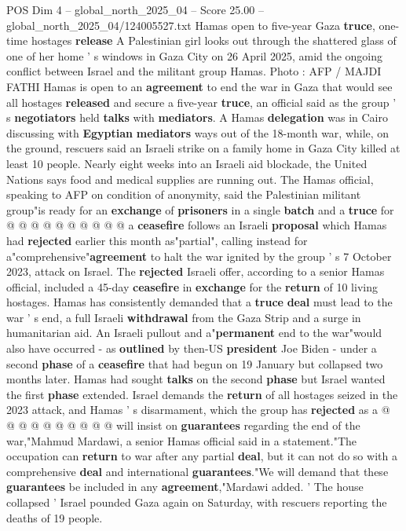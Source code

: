\begin{textsample}{POS Dim 4 – global\_north\_2025\_04 – Score 25.00 – global\_north\_2025\_04/124005527.txt}  \label{ex:f4_pos_224}
Hamas open to five-year Gaza \textbf{truce}, one-time hostages \textbf{release} A Palestinian girl looks out through the shattered glass of one of her home ' s windows in Gaza City on 26 April 2025, amid the ongoing conflict between Israel and the militant group Hamas.
Photo : AFP / MAJDI FATHI Hamas is open to an \textbf{agreement} to end the war in Gaza that would see all hostages \textbf{released} and secure a five-year \textbf{truce}, an official said as the group ' s \textbf{negotiators} held \textbf{talks} with \textbf{mediators}.
A Hamas \textbf{delegation} was in Cairo discussing with \textbf{Egyptian} \textbf{mediators} ways out of the 18-month war, while, on the ground, rescuers said an Israeli strike on a family home in Gaza City killed at least 10 people.
Nearly eight weeks into an Israeli aid blockade, the United Nations says food and medical supplies are running out.
The Hamas official, speaking to AFP on condition of anonymity, said the Palestinian militant group"is ready for an \textbf{exchange} of \textbf{prisoners} in a single \textbf{batch} and a \textbf{truce} for @ @ @ @ @ @ @ @ @ @ a \textbf{ceasefire} follows an Israeli \textbf{proposal} which Hamas had \textbf{rejected} earlier this month as"partial", calling instead for a"comprehensive"\textbf{agreement} to halt the war ignited by the group ' s 7 October 2023, attack on Israel.
The \textbf{rejected} Israeli offer, according to a senior Hamas official, included a 45-day \textbf{ceasefire} in \textbf{exchange} for the \textbf{return} of 10 living hostages.
Hamas has consistently demanded that a \textbf{truce} \textbf{deal} must lead to the war ' s end, a full Israeli \textbf{withdrawal} from the Gaza Strip and a surge in humanitarian aid.
An Israeli pullout and a"\textbf{permanent} end to the war"would also have occurred - as \textbf{outlined} by then-US \textbf{president} Joe Biden - under a second \textbf{phase} of a \textbf{ceasefire} that had begun on 19 January but collapsed two months later.
Hamas had sought \textbf{talks} on the second \textbf{phase} but Israel wanted the first \textbf{phase} extended.
Israel demands the \textbf{return} of all hostages seized in the 2023 attack, and Hamas ' s disarmament, which the group has \textbf{rejected} as a @ @ @ @ @ @ @ @ @ @ will insist on \textbf{guarantees} regarding the end of the war,"Mahmud Mardawi, a senior Hamas official said in a statement."The occupation can \textbf{return} to war after any partial \textbf{deal}, but it can not do so with a comprehensive \textbf{deal} and international \textbf{guarantees}."We will demand that these \textbf{guarantees} be included in any \textbf{agreement},"Mardawi added. ' The house collapsed ' Israel pounded Gaza again on Saturday, with rescuers reporting the deaths of 19 people.

\end{textsample}
